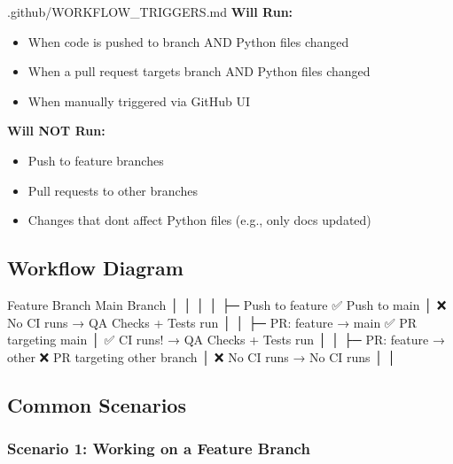 \begin{relocated}{.github/WORKFLOW_TRIGGERS.md}
\textbf{\ok{} Will Run:}

\begin{itemize}
\tightlist
\item
  When code is pushed to  branch AND Python files changed
\item
  When a pull request targets  branch AND Python files
  changed
\item
  When manually triggered via GitHub UI
\end{itemize}

\textbf{\bad{} Will NOT Run:}

\begin{itemize}
\tightlist
\item
  Push to feature branches
\item
  Pull requests to other branches
\item
  Changes that don\textquotesingle t affect Python files (e.g., only
  docs updated)
\end{itemize}

\subsection{Workflow Diagram}\label{um:flow:workflow-triggers:workflow-diagram}

\begin{textblock}
Feature Branch                Main Branch
     │                             │
     │                             │
     ├─ Push to feature      ✅ Push to main
     │  ❌ No CI runs            → QA Checks + Tests run
     │                             │
     ├─ PR: feature → main   ✅ PR targeting main
     │  ✅ CI runs!               → QA Checks + Tests run
     │                             │
     ├─ PR: feature → other  ❌ PR targeting other branch
     │  ❌ No CI runs            → No CI runs
     │                             │
\end{textblock}

\subsection{Common Scenarios}\label{um:flow:workflow-triggers:common-scenarios}

\subsubsection{Scenario 1: Working on a Feature Branch}\label{um:flow:workflow-triggers:scenario-1-working-on-a-feature-branch}


\end{relocated}
